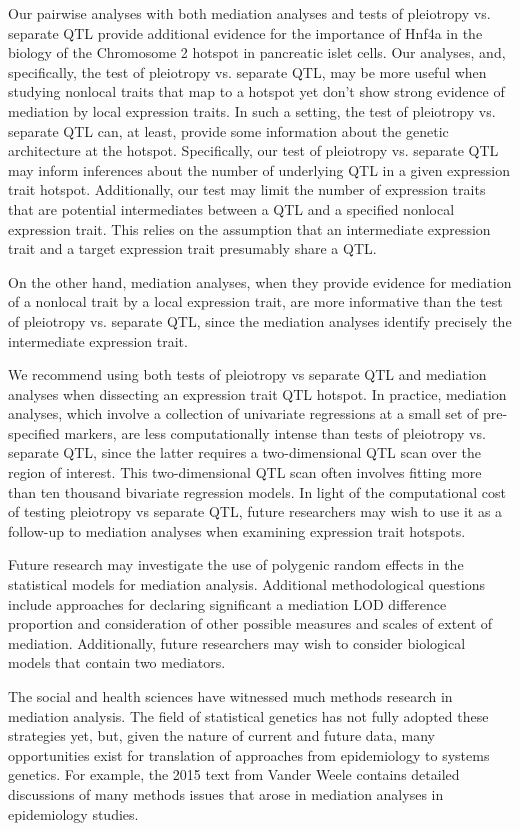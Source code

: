 \documentclass{article}
\begin{document}
Our pairwise analyses with both mediation analyses and tests of pleiotropy vs. separate QTL provide additional evidence for the importance of Hnf4a in the biology of the Chromosome 2 hotspot in pancreatic islet cells. Our analyses, and, specifically, the test of pleiotropy vs. separate QTL, may be more useful when studying nonlocal traits that map to a hotspot yet don't show strong evidence of mediation by local expression traits. In such a setting, the test of pleiotropy vs. separate QTL can, at least, provide some information about the genetic architecture at the hotspot. Specifically, our test of pleiotropy vs. separate QTL may inform inferences about the number of underlying QTL in a given expression trait hotspot. Additionally, our test may limit the number of expression traits that are potential intermediates between a QTL and a specified nonlocal expression trait. This relies on the assumption that an intermediate expression trait and a target expression trait presumably share a QTL. 

On the other hand, mediation analyses, when they provide evidence for mediation of a nonlocal trait by a local expression trait, are more informative than the test of pleiotropy vs. separate QTL, since the mediation analyses identify precisely the intermediate expression trait. 

We recommend using both tests of pleiotropy vs separate QTL and mediation analyses when dissecting an expression trait QTL hotspot. In practice, mediation analyses, which involve a collection of univariate regressions at a small set of pre-specified markers, are less computationally intense than tests of pleiotropy vs. separate QTL, since the latter requires a two-dimensional QTL scan over the region of interest. This two-dimensional QTL scan often involves fitting more than ten thousand bivariate regression models. In light of the computational cost of testing pleiotropy vs separate QTL, future researchers may wish to use it as a follow-up to mediation analyses when examining expression trait hotspots.

Future research may investigate the use of polygenic random effects in the statistical models for mediation analysis. Additional methodological questions include approaches for declaring significant a mediation LOD difference proportion and consideration of other possible measures and scales of extent of mediation. Additionally, future researchers may wish to consider biological models that contain two mediators. 

The social and health sciences have witnessed much methods research in  mediation analysis. The field of statistical genetics has not fully adopted these strategies yet, but, given the nature of current and future data, many opportunities exist for translation of approaches from epidemiology to systems genetics. For example, the 2015 text from Vander Weele contains detailed discussions of many methods issues that arose in mediation analyses in epidemiology studies.
\end{document}
